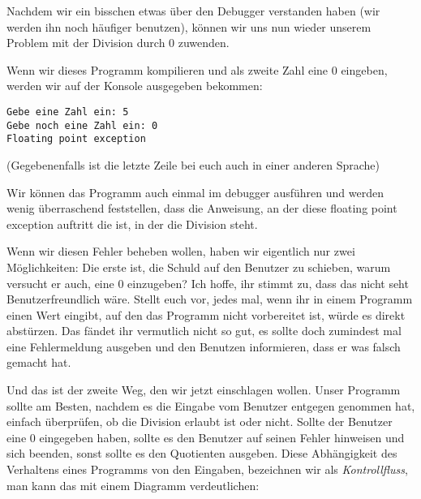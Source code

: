 
Nachdem wir ein bisschen etwas über den Debugger verstanden haben (wir werden
ihn noch häufiger benutzen), können wir uns nun wieder unserem Problem mit der
Division durch 0 zuwenden.


Wenn wir dieses Programm kompilieren und als zweite Zahl eine 0 eingeben,
werden wir auf der Konsole ausgegeben bekommen:
\begin{verbatim}
Gebe eine Zahl ein: 5
Gebe noch eine Zahl ein: 0
Floating point exception
\end{verbatim}
(Gegebenenfalls ist die letzte Zeile bei euch auch in einer anderen Sprache)

Wir können das Programm auch einmal im debugger ausführen und werden wenig
überraschend feststellen, dass die Anweisung, an der diese floating point
exception auftritt die ist, in der die Division steht.

Wenn wir diesen Fehler beheben wollen, haben wir eigentlich nur zwei
Möglichkeiten: Die erste ist, die Schuld auf den Benutzer zu schieben, warum
versucht er auch, eine 0 einzugeben? Ich hoffe, ihr stimmt zu, dass das nicht
seht Benutzerfreundlich wäre. Stellt euch vor, jedes mal, wenn ihr in einem
Programm einen Wert eingibt, auf den das Programm nicht vorbereitet ist, würde
es direkt abstürzen. Das fändet ihr vermutlich nicht so gut, es sollte doch
zumindest mal eine Fehlermeldung ausgeben und den Benutzen informieren, dass er
was falsch gemacht hat.

Und das ist der zweite Weg, den wir jetzt einschlagen wollen. Unser Programm
sollte am Besten, nachdem es die Eingabe vom Benutzer entgegen genommen hat,
einfach überprüfen, ob die Division erlaubt ist oder nicht. Sollte der Benutzer
eine 0 eingegeben haben, sollte es den Benutzer auf seinen Fehler hinweisen und
sich beenden, sonst sollte es den Quotienten ausgeben. Diese Abhängigkeit des
Verhaltens eines Programms von den Eingaben, bezeichnen wir als
\emph{Kontrollfluss}, man kann das mit einem Diagramm verdeutlichen:

\begin{center}
\end{center}

